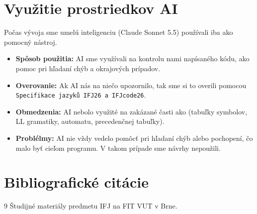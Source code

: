 \section{Využitie prostriedkov AI}
Počas vývoja sme umelú inteligenciu (Claude Sonnet 5.5) používali iba ako pomocný nástroj.
\begin{itemize}
	\item \textbf{Spôsob použitia:} AI sme využívali na kontrolu nami napísaného kódu, ako pomoc pri hľadaní chýb a okrajových prípadov.
	\item \textbf{Overovanie:} Ak AI nás na niečo upozornilo, tak sme si to overili pomocou \texttt{Specifikace jazyků IFJ26 a IFJcode26}.
	\item \textbf{Obmedzenia:} AI nebolo využité na zakázané časti ako (tabuľky symbolov, LL gramatiky, automatu, precedenčnej tabuľky).
	\item \textbf{Problélmy:} AI nie vždy vedelo pomôcť pri hľadaní chýb alebo pochopení, čo malo byť cieľom programu. V takom prípade sme návrhy nepoužili.
\end{itemize}

\section{Bibliografické citácie}
\begin{thebibliography}{9}
     Študijné materiály predmetu IFJ na FIT VUT v Brne.
\end{thebibliography}